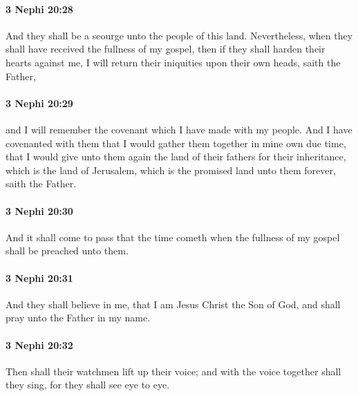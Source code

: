 		\paragraph{3 Nephi 20:28} %
			\label{3NEPHI-20-28}

			And they shall be a scourge unto the people of this land.
			Nevertheless, when they shall have received the fullness of my gospel,
			then if they shall harden their hearts against me,
			I will return their iniquities upon their own heads, saith the Father,

		\paragraph{3 Nephi 20:29} %
			\label{3NEPHI-20-29}

			
			and I will remember the covenant which I have made with my people.
			And I have covenanted with them
			that I would gather them together in mine own due time,
			that I would give unto them again the land of their fathers for their inheritance,
			which is the land of Jerusalem,
			which is the promised land unto them forever, saith the Father.

		\paragraph{3 Nephi 20:30} %
			\label{3NEPHI-20-30}

			And it shall come to pass that the time cometh
			when the fullness of my gospel shall be preached unto them.

		\paragraph{3 Nephi 20:31} %
			\label{3NEPHI-20-31}

			And they shall believe in me,
			that I am Jesus Christ the Son of God,
			and shall pray unto the Father in my name.

		\paragraph{3 Nephi 20:32} %
			\label{3NEPHI-20-32}

			Then shall their watchmen lift up their voice;
			and with the voice together shall they sing,
			for they shall see eye to eye.


